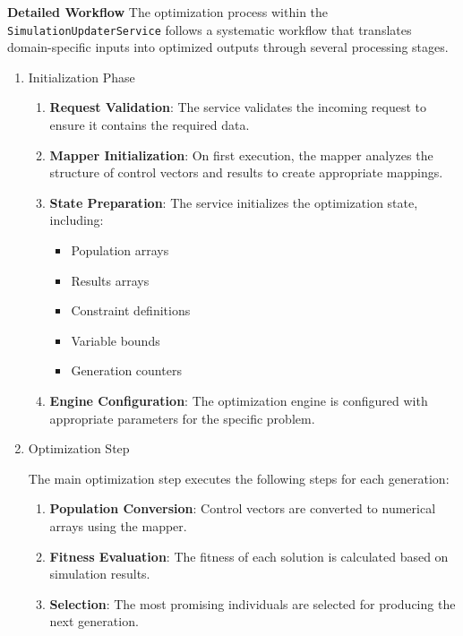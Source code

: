 \bigskip
\textbf{Detailed Workflow}
The optimization process within the \texttt{SimulationUpdaterService} follows a systematic workflow that translates domain-specific inputs into optimized outputs through several processing stages.

\begin{enumerate}

\item Initialization Phase

\begin{enumerate}
	\item \textbf{Request Validation}: The service validates the incoming request to ensure it contains the required data.

	\item \textbf{Mapper Initialization}: On first execution, the mapper analyzes the structure of control vectors and results to create appropriate mappings.

	\item \textbf{State Preparation}: The service initializes the optimization state, including:
	\begin{itemize}
		\item Population arrays
		\item Results arrays
		\item Constraint definitions
		\item Variable bounds
		\item Generation counters
	\end{itemize}

	\item \textbf{Engine Configuration}: The optimization engine is configured with appropriate parameters for the specific problem.
\end{enumerate}

\item Optimization Step

The main optimization step executes the following steps for each generation:

\begin{enumerate}
	\item \textbf{Population Conversion}: Control vectors are converted to numerical arrays using the mapper.

	\item \textbf{Fitness Evaluation}: The fitness of each solution is calculated based on simulation results.

	\item \textbf{Selection}: The most promising individuals are selected for producing the next generation.


\end{enumerate}
\end{enumerate}
